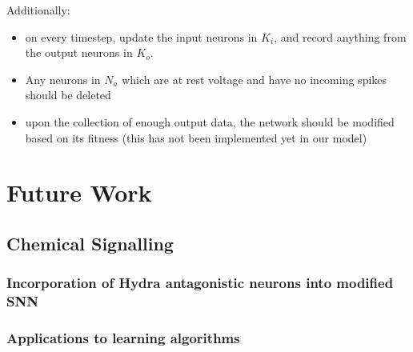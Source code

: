 \documentclass{article}
\begin{document}
Additionally:
\begin{itemize}
    \item on every timestep, update the input neurons in $K_i$, and record anything from the output neurons in $K_o$. 
    \item Any neurons in $N_a$ which are at rest voltage and have no incoming spikes should be deleted
    \item upon the collection of enough output data, the network should be modified based on its fitness (this has not been implemented yet in our model)
\end{itemize}

\newpage

\section{Future Work}


\subsection{Chemical Signalling}

\subsubsection{Incorporation of Hydra antagonistic neurons into modified SNN}


\subsubsection{Applications to learning algorithms}
\end{document}
